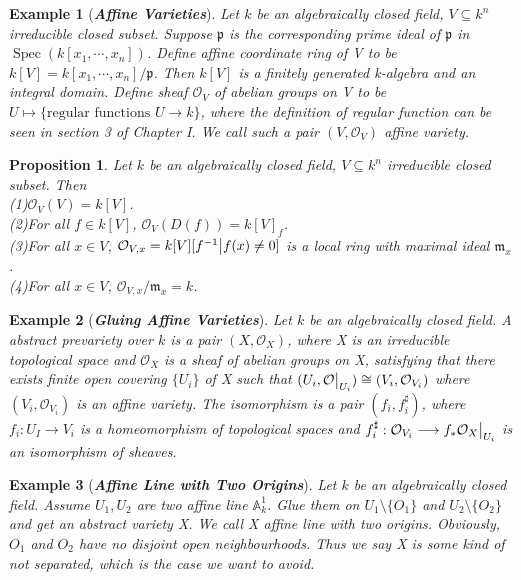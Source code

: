 \documentclass{ctexart}
\newtheorem{proposition}{Proposition}[section]
\newtheorem{example}{Example}[section]
\newcommand{\spec}{\operatorname{Spec}}
\begin{document}
\begin{example}[\textbf{\emph{Affine Varieties}}]
    Let $k$ be an algebraically closed field, $V \subseteq k^{n}$ irreducible closed subset.
    Suppose $\mathfrak{p}$ is the corresponding prime ideal of $\mathfrak{p}$ in $\spec(k[x_{1}, \cdots, x_{n}])$.
    Define affine coordinate ring of V to be $k[V] = k[x_{1}, \cdots, x_{n}]/\mathfrak{p}$.
    Then $k[V]$ is a finitely generated k-algebra and an integral domain.
    Define sheaf $\mathcal{O}_{V}$ of abelian groups on V to be $U \longmapsto \{\text{regular functions $U \longrightarrow k$}\}$,
    where the definition of regular function can be seen in section 3 of Chapter I.
    We call such a pair $(V, \mathcal{O}_{V})$ affine variety.
\end{example}
\begin{proposition}
    Let $k$ be an algebraically closed field, $V \subseteq k^{n}$ irreducible closed subset.
    Then \\
    (1)$\mathcal{O}_{V}(V) = k[V]$. \\
    (2)For all $f\in k[V]$, $\mathcal{O}_{V}(D(f)) = k[V]_{f}$. \\
    (3)For all $x\in V$, $\mathcal{O}_{V, x} = k[V][f^{-1} \big{|} f(x) \neq 0]$ is a local ring with maximal ideal $\mathfrak{m}_{x}$. \\
    (4)For all $x\in V$, $\mathcal{O}_{V, x}/\mathfrak{m}_{x} = k$.
    \label{Proposition 1.9}
\end{proposition}
\begin{example}[\textbf{\emph{Gluing Affine Varieties}}]
    Let $k$ be an algebraically closed field.
    A abstract prevariety over $k$ is a pair $(X, \mathcal{O}_{X})$, where X is an irreducible topological space and $\mathcal{O}_{X}$ is a sheaf of abelian groups on X,
    satisfying that there exists finite open covering $\{U_{i}\}$ of X such that $(U_{i}, \mathcal{O}\big{|}_{U_{i}}) \cong (V_{i}, \mathcal{O}_{V_{i}})$ where $(V_{i}, \mathcal{O}_{V_{i}})$ is an affine variety.
    The isomorphism is a pair $(f_{i}, f_{i}^{\sharp})$, where $f_{i}: U_{I} \longrightarrow V_{i}$ is a homeomorphism of topological spaces and $f_{i}^{\sharp}: \mathcal{O}_{V_{i}} \longrightarrow f_{\ast}\mathcal{O}_{X}\big{|}_{U_{i}}$ is an isomorphism of sheaves. 
\end{example}
\begin{example}[\textbf{\emph{Affine Line with Two Origins}}]
    Let $k$ be an algebraically closed field.
    Assume $U_{1}, U_{2}$ are two affine line $\mathbb{A}_{k}^{1}$.
    Glue them on $U_{1} \setminus \{O_{1}\}$ and $U_{2} \setminus \{O_{2}\}$ and get an abstract variety X.
    We call X affine line with two origins.
    Obviously, $O_{1}$ and $O_{2}$ have no disjoint open neighbourhoods.
    Thus we say X is some kind of not separated, which is the case we want to avoid.
\end{example}
\end{document}

